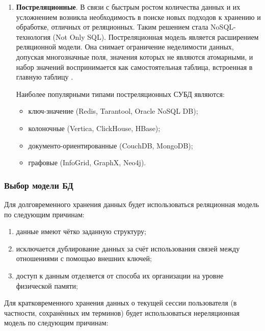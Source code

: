 \begin{enumerate}[label*=\arabic*.]
	\item \textbf{Постреляционные}. \newline
	В связи с быстрым ростом количества данных и их усложнением возникла необходимость в поиске новых подходов к хранению и обработке, отличных от реляционных. Таким решением стала NoSQL-технология (Not Only SQL). Постреляционная модель является расширением реляционной модели. Она снимает ограничение неделимости данных, допуская многозначные поля, значения которых не являются атомарными, и набор значений воспринимается как самостоятельная таблица, встроенная в главную таблицу \cite{Markin}.
	
	Наиболее популярными типами постреляционных СУБД являются:
	
	\begin{itemize}[label*=---]
		\item ключ-значение (Redis, Tarantool, Oracle NoSQL DB);
		\item колоночные (Vertica, ClickHouse, HBase);
		\item документо-ориентированные (CouchDB, MongoDB);
		\item графовые (InfoGrid, GraphX, Neo4j).
	
	\end{itemize}
	
\end{enumerate}



\subsubsection{Выбор модели БД}

Для долговременного хранения данных будет использоваться реляционная модель по следующим причинам:

\begin{enumerate}[label*=\arabic*)]
	\item данные имеют чётко заданную структуру;
	\item исключается дублирование данных за счёт использования связей между отношениями с помощью внешних ключей;
	\item доступ к данным отделяется от способа их организации на уровне физической памяти;
	
\end{enumerate}

Для кратковременного хранения данных о текущей сессии пользователя (в частности, сохранённых им терминов) будет использоваться нереляционная модель по следующим причинам:

